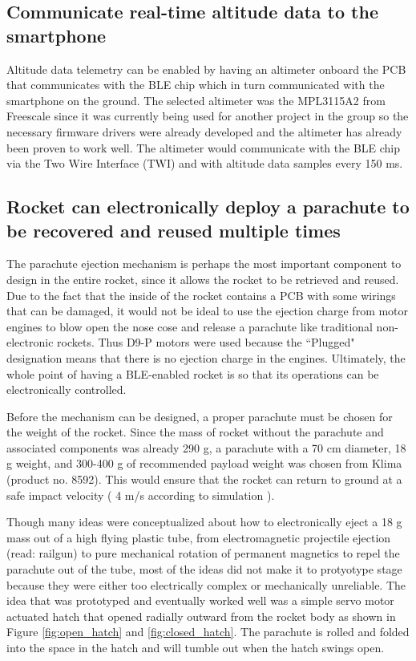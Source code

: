 \documentclass{workreport}
\begin{document}
\begin{body}
	\subsection{Communicate real-time altitude data to the smartphone}
		Altitude data telemetry can be enabled by having an altimeter onboard the PCB that communicates with the BLE chip which in turn communicated with the smartphone on the ground. The selected altimeter was the MPL3115A2 from Freescale since it was currently being used for another project in the group so the necessary firmware drivers were already developed and the altimeter has already been proven to work well. The altimeter would communicate with the BLE chip via the Two Wire Interface (TWI) and with altitude data samples every 150 ms.

	\subsection{Rocket can electronically deploy a parachute to be recovered and reused multiple times}

	The parachute ejection mechanism is perhaps the most important component to design in the entire rocket, since it allows the rocket to be retrieved and reused. Due to the fact that the inside of the rocket contains a PCB with some wirings that can be damaged, it would not be ideal to use the ejection charge from motor engines to blow open the nose cose and release a parachute like traditional non-electronic rockets. Thus D9-P motors were used because the ``Plugged" designation means that there is no ejection charge in the engines. Ultimately, the whole point of having a BLE-enabled rocket is so that its operations can be electronically controlled.

	Before the mechanism can be designed, a proper parachute must be chosen for the weight of the rocket. Since the mass of rocket without the parachute and associated components was already 290 g, a parachute with a 70 cm diameter, 18 g weight, and 300-400 g of recommended payload weight was chosen from Klima (product no. 8592). This would ensure that the rocket can return to ground at a safe impact velocity ( 4 m/s according to simulation ).

	Though many ideas were conceptualized about how to electronically eject a 18 g mass out of a high flying plastic tube, from electromagnetic projectile ejection (read: railgun) to pure mechanical rotation of permanent magnetics to repel the parachute out of the tube, most of the ideas did not make it to protyotype stage because they were either too electrically complex or mechanically unreliable. The idea that was prototyped and eventually worked well was a simple servo motor actuated hatch that opened radially outward from the rocket body as shown in Figure \ref{fig:open_hatch} and \ref{fig:closed_hatch}. The parachute is rolled and folded into the space in the hatch and will tumble out when the hatch swings open.


\end{body}
\end{document}
